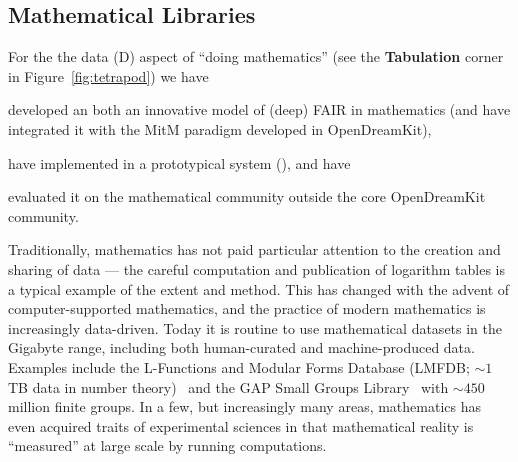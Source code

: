 \subsection{Mathematical Libraries}\label{sec:mathlib}



For the the data (D) aspect of ``doing mathematics'' (see the \textbf{Tabulation} corner in Figure~\ref{fig:tetrapod}) we have
\begin{compactenum}
\item developed an both an innovative model of (deep) FAIR in mathematics (and have integrated it with the MitM paradigm developed in OpenDreamKit),
\item have implemented in a prototypical system (\dmh), and have
\item evaluated it on the mathematical community outside the core OpenDreamKit community.
\end{compactenum}

Traditionally, mathematics has not paid particular attention to the creation and sharing of data --- the careful computation and publication of logarithm tables is a typical example of the extent and method.
This has changed with the advent of computer-supported mathematics, and the practice of modern mathematics is increasingly data-driven.
Today it is routine to use mathematical datasets in the Gigabyte range, including both human-curated and machine-produced data.
Examples include the L-Functions and Modular Forms Database (LMFDB; $\sim 1$ TB data in number theory)~\cite{Cremona:LMFDB16,lmfdb:on} and the GAP Small Groups Library~\cite{GapSmallGroups:on} with $\sim 450$ million finite groups.  
In a few, but increasingly many areas, mathematics has even acquired traits of experimental sciences in that mathematical reality is ``measured'' at large scale by running computations.

